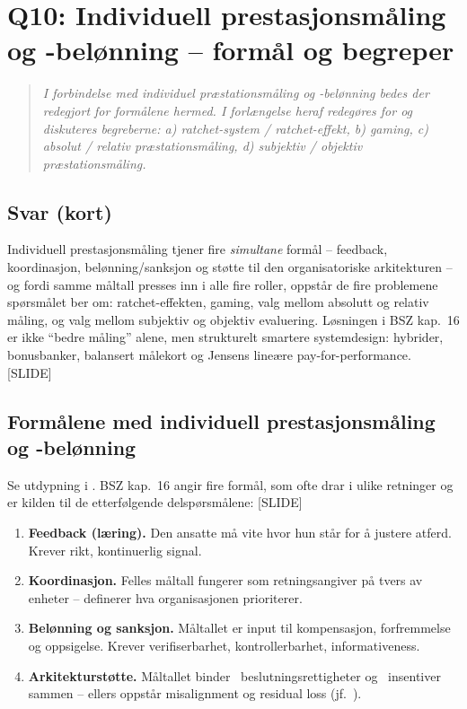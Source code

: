\section{Q10: Individuell prestasjonsmåling og -belønning -- formål og begreper}\label{q:10}

\begin{quote}
\emph{I forbindelse med individuel præstationsmåling og -belønning bedes der redegjort for formålene hermed. I forlængelse heraf redegøres for og diskuteres begreberne: a) ratchet-system / ratchet-effekt, b) gaming, c) absolut / relativ præstationsmåling, d) subjektiv / objektiv præstationsmåling.}
\end{quote}

\subsection*{Svar (kort)}
Individuell prestasjonsmåling tjener fire \emph{simultane} formål -- feedback, koordinasjon, belønning/sanksjon og støtte til den organisatoriske arkitekturen -- og fordi samme måltall presses inn i alle fire roller, oppstår de fire problemene spørsmålet ber om: ratchet-effekten, gaming, valg mellom absolutt og relativ måling, og valg mellom subjektiv og objektiv evaluering. Løsningen i BSZ kap.\ 16 er ikke ``bedre måling'' alene, men strukturelt smartere systemdesign: hybrider, bonusbanker, balansert målekort og Jensens lineære pay-for-performance. [SLIDE]

\subsection*{Formålene med individuell prestasjonsmåling og -belønning}

Se utdypning i . BSZ kap.\ 16 angir fire formål, som ofte drar i ulike retninger og er kilden til de etterfølgende delspørsmålene: [SLIDE]

\begin{enumerate}\setlength{\itemsep}{2pt}
\item \textbf{Feedback (læring).} Den ansatte må vite hvor hun står for å justere atferd. Krever rikt, kontinuerlig signal.
\item \textbf{Koordinasjon.} Felles måltall fungerer som retningsangiver på tvers av enheter -- definerer hva organisasjonen prioriterer.
\item \textbf{Belønning og sanksjon.} Måltallet er input til kompensasjon, forfremmelse og oppsigelse. Krever verifiserbarhet, kontrollerbarhet, informativeness.
\item \textbf{Arkitekturstøtte.} Måltallet binder \SOne\ beslutningsrettigheter og \SThree\ insentiver sammen -- ellers oppstår misalignment og residual loss (jf.\ ).
\end{enumerate}

